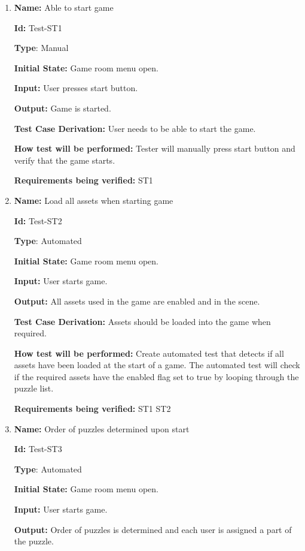 \documentclass[12pt, titlepage]{article}
\begin{document}
\begin{enumerate}

\item{\textbf{Name:} Able to start game} \label{itm:Test-ST1}

\textbf{Id:} Test-ST1

\textbf{Type}: Manual

\textbf{Initial State:} Game room menu open.

\textbf{Input:} User presses start button.

\textbf{Output:} Game is started.

\textbf{Test Case Derivation:} User needs to be able to start the game.

\textbf{How test will be performed:} Tester will manually press start button and verify that the game starts.

\textbf{Requirements being verified: } ST1

\item{\textbf{Name:} Load all assets when starting game} \label{itm:Test-ST2}

\textbf{Id:} Test-ST2

\textbf{Type}: Automated

\textbf{Initial State:} Game room menu open.

\textbf{Input:} User starts game.

\textbf{Output:} All assets used in the game are enabled and in the scene.

\textbf{Test Case Derivation:} Assets should be loaded into the game when required.

\textbf{How test will be performed:} Create automated test that detects if all assets have been loaded at the start of a game. The automated test will check if the required assets have the enabled flag set to true by looping through the puzzle list. 

\textbf{Requirements being verified: } ST1 ST2

\item{\textbf{Name:} Order of puzzles determined upon start} \label{itm:Test-ST3}

\textbf{Id:} Test-ST3

\textbf{Type}: Automated

\textbf{Initial State:} Game room menu open.

\textbf{Input:} User starts game.

\textbf{Output:} Order of puzzles is determined and each user is assigned a part of the puzzle.


\end{enumerate}
\end{document}
